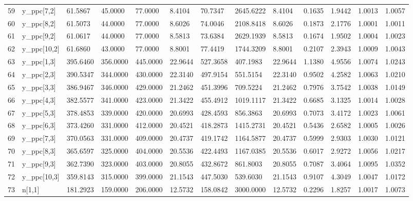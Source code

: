 \begin{table}[ht]
\begin{tabular}{rllllllllllll}
  59 & y\_ppc[7,2] &  61.5867 &  45.0000 &  77.0000 &  8.4104 &   70.7347 & 2645.6222 &  8.4104 & 0.1635 &  1.9442 & 1.0013 & 1.0057 \\ 
  60 & y\_ppc[8,2] &  61.5073 &  44.0000 &  77.0000 &  8.6026 &   74.0046 & 2108.8418 &  8.6026 & 0.1873 &  2.1776 & 1.0001 & 1.0011 \\ 
  61 & y\_ppc[9,2] &  61.0617 &  44.0000 &  77.0000 &  8.5813 &   73.6384 & 2629.1939 &  8.5813 & 0.1674 &  1.9502 & 1.0004 & 1.0023 \\ 
  62 & y\_ppc[10,2] &  61.6860 &  43.0000 &  77.0000 &  8.8001 &   77.4419 & 1744.3209 &  8.8001 & 0.2107 &  2.3943 & 1.0009 & 1.0043 \\ 
  63 & y\_ppc[1,3] & 395.6460 & 356.0000 & 445.0000 & 22.9644 &  527.3658 &  407.1983 & 22.9644 & 1.1380 &  4.9556 & 1.0074 & 1.0243 \\ 
  64 & y\_ppc[2,3] & 390.5347 & 344.0000 & 430.0000 & 22.3140 &  497.9154 &  551.5154 & 22.3140 & 0.9502 &  4.2582 & 1.0063 & 1.0210 \\ 
  65 & y\_ppc[3,3] & 386.9467 & 346.0000 & 429.0000 & 21.2462 &  451.3996 &  709.5224 & 21.2462 & 0.7976 &  3.7542 & 1.0038 & 1.0149 \\ 
  66 & y\_ppc[4,3] & 382.5577 & 341.0000 & 423.0000 & 21.3422 &  455.4912 & 1019.1117 & 21.3422 & 0.6685 &  3.1325 & 1.0014 & 1.0028 \\ 
  67 & y\_ppc[5,3] & 378.4853 & 339.0000 & 420.0000 & 20.6993 &  428.4593 &  856.3863 & 20.6993 & 0.7073 &  3.4172 & 1.0023 & 1.0061 \\ 
  68 & y\_ppc[6,3] & 373.4260 & 331.0000 & 412.0000 & 20.4521 &  418.2873 & 1415.2731 & 20.4521 & 0.5436 &  2.6582 & 1.0005 & 1.0026 \\ 
  69 & y\_ppc[7,3] & 370.0563 & 331.0000 & 409.0000 & 20.4737 &  419.1742 & 1164.5877 & 20.4737 & 0.5999 &  2.9303 & 1.0030 & 1.0121 \\ 
  70 & y\_ppc[8,3] & 365.6597 & 325.0000 & 404.0000 & 20.5536 &  422.4493 & 1167.0385 & 20.5536 & 0.6017 &  2.9272 & 1.0056 & 1.0217 \\ 
  71 & y\_ppc[9,3] & 362.7390 & 323.0000 & 403.0000 & 20.8055 &  432.8672 &  861.8003 & 20.8055 & 0.7087 &  3.4064 & 1.0095 & 1.0352 \\ 
  72 & y\_ppc[10,3] & 359.8143 & 315.0000 & 399.0000 & 21.1543 &  447.5030 &  539.6030 & 21.1543 & 0.9107 &  4.3049 & 1.0047 & 1.0172 \\ 
  73 & n[1,1] & 181.2923 & 159.0000 & 206.0000 & 12.5732 &  158.0842 & 3000.0000 & 12.5732 & 0.2296 &  1.8257 & 1.0017 & 1.0073 \\ 

\end{tabular}
\end{table}
